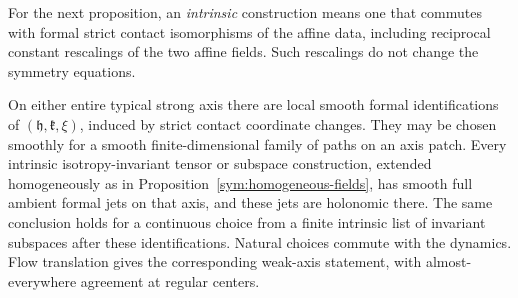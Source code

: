 For the next proposition, an \emph{intrinsic} construction means one
that commutes with formal strict contact isomorphisms of the affine
data, including reciprocal constant rescalings of the two affine
fields.  Such rescalings do not change the symmetry equations.

\begin{proposition}
\label{sym:axis-transport}
On either entire typical strong axis there are local smooth formal
identifications of $(\mathfrak h,\mathfrak k,\xi)$, induced by strict
contact coordinate changes.  They may be chosen smoothly for a
smooth finite-dimensional family of paths on an axis patch.
Every intrinsic isotropy-invariant tensor or subspace construction,
extended homogeneously as in
Proposition~\ref{sym:homogeneous-fields}, has smooth full ambient
formal jets on that axis, and these jets are holonomic there.
The same conclusion holds for a continuous choice from a finite
intrinsic list of invariant subspaces after these identifications.
Natural choices commute with the dynamics.  Flow translation gives
the corresponding weak-axis statement, with almost-everywhere
agreement at regular centers.
\end{proposition}

